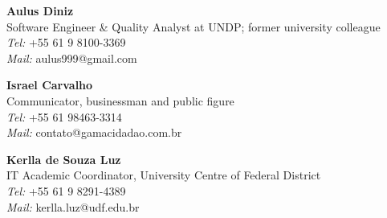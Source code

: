 
\textbf{Aulus Diniz} \\
Software Engineer \& Quality Analyst at UNDP; former university colleague \\
\emph{Tel:} +55 61 9 8100-3369 \\
\emph{Mail:} aulus999@gmail.com

\divider

\textbf{Israel Carvalho} \\
Communicator, businessman and public figure \\
\emph{Tel:} +55 61 98463-3314 \\
\emph{Mail:} contato@gamacidadao.com.br

\divider

\textbf{Kerlla de Souza Luz} \\
IT Academic Coordinator, University Centre of Federal District \\
\emph{Tel:} +55 61 9 8291-4389 \\
\emph{Mail:} kerlla.luz@udf.edu.br
